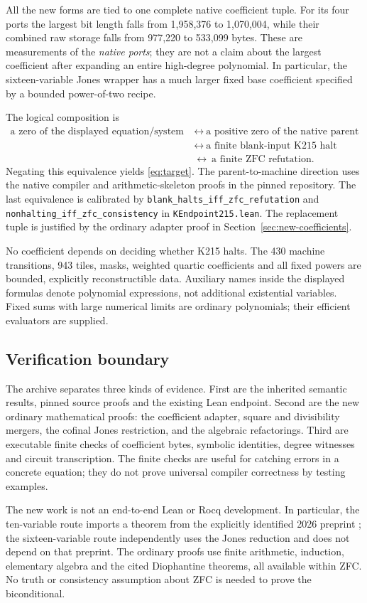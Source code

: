 All the new forms are tied to one complete native coefficient tuple.
For its four ports the largest bit length falls from 1,958,376 to
1,070,004, while their combined raw storage falls from 977,220 to
533,099 bytes.  These are measurements of the \emph{native ports}; they
are not a claim about the largest coefficient after expanding an entire
high-degree polynomial.  In particular, the sixteen-variable Jones
wrapper has a much larger fixed base coefficient specified by a bounded
power-of-two recipe.

The logical composition is
\begin{align*}
 \text{a zero of the displayed equation/system}
 &\ \longleftrightarrow\ \text{a positive zero of the native parent}\\
 &\ \longleftrightarrow\ \text{a finite blank-input K215 halt}\\
 &\ \longleftrightarrow\ \text{a finite ZFC refutation}.
\end{align*}
Negating this equivalence yields \eqref{eq:target}.  The parent-to-machine
direction uses the native compiler and arithmetic-skeleton proofs in
the pinned repository.  The last equivalence is calibrated by
\texttt{blank\_halts\_iff\_zfc\_refutation} and
\texttt{nonhalting\_iff\_zfc\_consistency} in
\texttt{KEndpoint215.lean}.  The replacement tuple is justified by the
ordinary adapter proof in Section~\ref{sec:new-coefficients}.

No coefficient depends on deciding whether K215 halts.  The 430 machine
transitions, 943 tiles, masks, weighted quartic coefficients and all fixed
powers are bounded, explicitly reconstructible data.  Auxiliary names
inside the displayed formulas denote polynomial expressions, not
additional existential variables.  Fixed sums with large numerical
limits are ordinary polynomials; their efficient evaluators are supplied.

\subsection{Verification boundary}

The archive separates three kinds of evidence.  First are the inherited
semantic results, pinned source proofs and the existing Lean endpoint.
Second are the new ordinary mathematical proofs: the coefficient adapter,
square and divisibility mergers, the cofinal Jones restriction, and the
algebraic refactorings.  Third are executable finite checks of coefficient
bytes, symbolic identities, degree witnesses and circuit transcription.
The finite checks are useful for catching errors in a concrete equation;
they do not prove universal compiler correctness by testing examples.

The new work is not an end-to-end Lean or Rocq development.  In particular,
the ten-variable route imports a theorem from the explicitly identified
2026 preprint \cite{sun2026}; the sixteen-variable route independently
uses the Jones reduction and does not depend on that preprint.  The
ordinary proofs use finite arithmetic, induction, elementary algebra and
the cited Diophantine theorems, all available within ZFC.  No truth or
consistency assumption about ZFC is needed to prove the biconditional.
